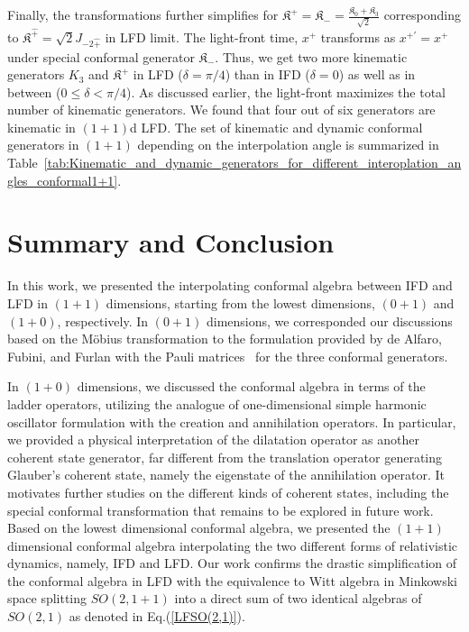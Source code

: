 \documentclass[%
 reprint,
superscriptaddress,
 amsmath,amssymb,
 aps,
]{revtex4-2}
\begin{document}
Finally, the transformations further simplifies for $\mathfrak{K}^{+}=\mathfrak{K}_{-}=\frac{\mathfrak{K}_{0}+\mathfrak{K}_{3}}{\sqrt{2}}$ corresponding to $\mathfrak{K}^{\hat{+}}=\sqrt{2}J_{-2\hat{+}}$ in LFD limit. The light-front time, $x^{+}$ transforms as $ x^{+\prime} =x^{+}$ under special conformal generator $\mathfrak{K}_{-}$. Thus, we get two more kinematic generators $K_3$ and $\mathfrak{K}^{+}$ in LFD ($\delta = \pi/4$) than in IFD ($\delta = 0$) as well as in between ($0 \le \delta <\pi/4$). As discussed earlier, the light-front maximizes the total number of kinematic generators. We found that four out of six generators are kinematic in $(1+1)$d LFD. The set of kinematic and dynamic conformal generators in $(1+1)$ depending on the interpolation angle is summarized in Table~\ref {tab:Kinematic_and_dynamic_generators_for_different_interoplation_angles_conformal1+1}.


\section{Summary and Conclusion}
\label{summary-conclusion}


In this work, we presented the interpolating conformal algebra between IFD and LFD in $(1+1)$ dimensions, 
starting from the lowest dimensions, $(0+1)$ and $(1+0)$, respectively. 
In $(0+1)$ dimensions, we corresponded our discussions based on the Möbius transformation to the formulation provided by de Alfaro, Fubini, and Furlan with the Pauli matrices~\cite{Fubini1976} for the three conformal generators.

In $(1+0)$ dimensions, we discussed the conformal algebra in terms of the ladder operators, utilizing the analogue of one-dimensional simple harmonic oscillator formulation with the creation and annihilation operators. In particular, we provided a physical interpretation of the dilatation operator as another coherent state generator, far different from the translation operator generating Glauber's coherent state, namely the eigenstate of the annihilation operator. It motivates further studies on the different kinds of coherent states, including the special conformal transformation that remains to be explored in future work. Based on the lowest dimensional conformal algebra, we presented the $(1+1)$ dimensional conformal algebra interpolating the two different forms of relativistic dynamics, namely, IFD and LFD. Our work confirms the drastic simplification of the conformal algebra in LFD with the equivalence to Witt algebra in Minkowski space splitting $SO(2,1+1)$ into a direct sum of two identical algebras of $SO(2,1)$ as denoted in Eq.(\ref{LFSO(2,1)}).
\end{document}
